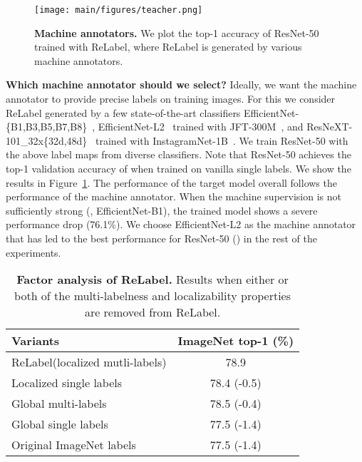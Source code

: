 \documentclass[final]{cvpr}
\newcommand\ours{{{\mbox{ReLabel}}}\xspace}
\begin{document}
\begin{figure}[t]
\centering
\texttt{[image: main/figures/teacher.png]}
\caption{\textbf{Machine annotators.} We plot the top-1 accuracy of ResNet-50 trained with \ours, where \ours is generated by various machine annotators.
}
\label{fig:strong_cls_ablation}
\vspace{-0.25cm}
\end{figure}

\noindent\textbf{Which machine annotator should we select?}
Ideally, we want the machine annotator to provide precise labels on training images. For this we consider \ours generated by a few state-of-the-art classifiers EfficientNet-\{B1,B3,B5,B7,B8\}~\cite{efficientnet}, EfficientNet-L2~\cite{xie2020noisy_student} trained with JFT-300M~\cite{sun2017revisiting}, and ResNeXT-101\_32x\{32d,48d\}~\cite{yalniz2019billion} trained with  InstagramNet-1B~\cite{InstagramNet}.
We train ResNet-50 with the above label maps from diverse classifiers.
Note that ResNet-50 achieves the top-1 validation accuracy of  when trained on vanilla single labels.
We show the results in Figure~\ref{fig:strong_cls_ablation}.
The performance of the target model overall follows the performance of the machine annotator. 
When the machine supervision is not sufficiently strong (\eg, EfficientNet-B1), the trained model shows a severe performance drop {(76.1\%)}. 
We choose EfficientNet-L2 as the machine annotator that has led to the best performance for ResNet-50 () in the rest of the experiments.


\begin{table}
\centering
\tabcolsep=0.12cm
\begin{tabular}{@{}lc@{}}
\toprule
Variants     & ImageNet top-1 (\%) \\ \midrule
\ours (localized mutli-labels) & 78.9 \\ \midrule         
Localized single labels    & 78.4 (-0.5) \\
Global multi-labels  &  78.5 (-0.4) \\
Global single labels &  77.5 (-1.4) \\ \midrule
Original ImageNet labels &  77.5 (-1.4) \\
\bottomrule
\end{tabular}
\caption{\textbf{Factor analysis of \ours.} Results when either or both of the multi-labelness and localizability properties are removed from \ours.
}
\label{tab:factor_analysis}
\vspace{-0.2cm}
\end{table}
 
\end{document}
